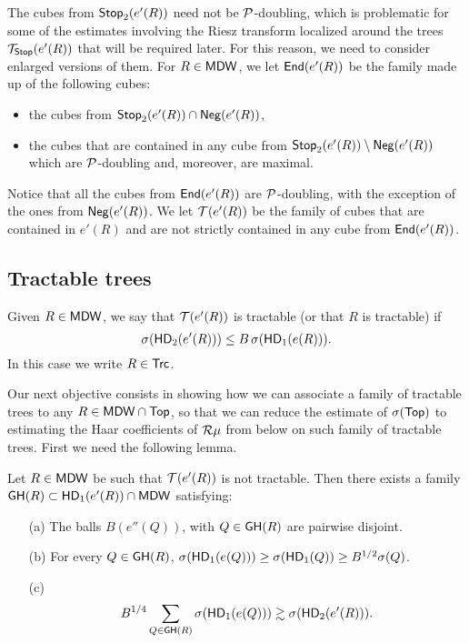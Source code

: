 The cubes from ${\mathsf {Stop}}_2(e'(R))$ need not be ${\mathcal P}$-doubling, which is problematic for some of the estimates involving the Riesz transform localized around the
trees ${\mathcal T}_{\mathsf {Stop}}(e'(R))$ that will be required later. For this reason, we need to consider enlarged versions of them. For $R\in{\mathsf{MDW}}$, we let ${\mathsf{End}}(e'(R))$ be the family made up of the following cubes:
\begin{itemize}
\item the cubes from ${\mathsf {Stop}}_2(e'(R))\cap {\mathsf{Neg}}(e'(R))$,
\item the cubes that are contained in any cube from ${\mathsf {Stop}}_2(e'(R))\setminus {\mathsf{Neg}}(e'(R))$ which are ${\mathcal P}$-doubling and, moreover, are maximal.
\end{itemize}
Notice that all the cubes from ${\mathsf{End}}(e'(R))$ are ${\mathcal P}$-doubling, with the exception of the ones from ${\mathsf{Neg}}(e'(R))$.
We let ${\mathcal T}(e'(R))$ be the family of cubes that are contained in $e'(R)$ and are not 
strictly contained in any cube from ${\mathsf{End}}(e'(R))$. 


 \vv
 
\subsection{Tractable trees}\label{subsec:trc} 
Given $R\in{\mathsf{MDW}}$, we say that ${\mathcal T}(e'(R))$ is tractable (or that $R$ is tractable) if 
$$\sigma({\mathsf{HD}}_2(e'(R)))\leq B\,\sigma({\mathsf{HD}}_1(e(R))).$$
In this case we write $R\in{\mathsf{Trc}}$.

 Our next objective consists in showing how we can associate a family of tractable trees to any $R\in{\mathsf{MDW}}\cap{\mathsf {Top}}$, so that we can reduce the estimate of $\sigma({\mathsf {Top}})$ to estimating the Haar coefficients of ${\mathcal R}\mu$ from below on such family of tractable trees.
First we need the following lemma.

\begin{lemma}\label{lemalg1}
Let $R\in{\mathsf{MDW}}$ be such that ${\mathcal T}(e'(R))$ is not tractable. Then there exists a family ${\mathsf{GH}}(R)\subset
{\mathsf{HD}}_1(e'(R))\cap{\mathsf{MDW}}$ satisfying:
\begin{itemize}
\item[(a)] The balls $B(e''(Q))$, with $Q\in{\mathsf{GH}}(R)$ are pairwise disjoint.
\item[(b)] For every $Q\in{\mathsf{GH}}(R)$, $\sigma({\mathsf{HD}}_1(e(Q)))\geq \sigma({\mathsf{HD}}_1(Q))\geq B^{1/2}\sigma(Q)$.
\item[(c)] $$B^{1/4} \sum_{Q\in{\mathsf{GH}}(R)} \sigma({\mathsf{HD}}_1(e(Q))) \gtrsim \sigma({\mathsf{HD}}_2(e'(R))).$$
\end{itemize}
\end{lemma}

